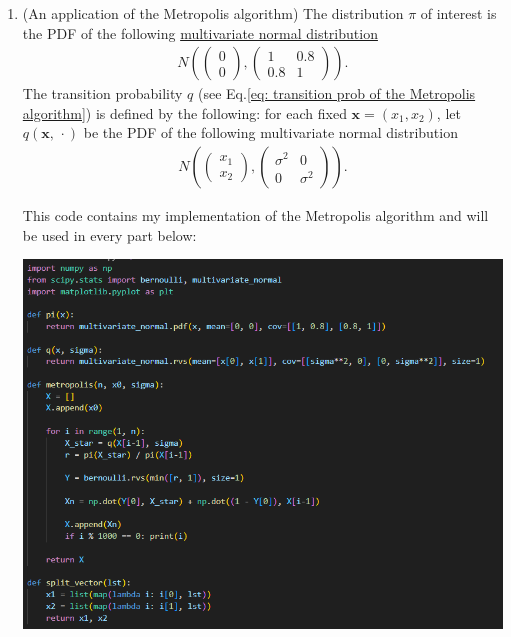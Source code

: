 \documentclass[11pt,letterpaper, leqno]{article}
\numberwithin{equation}{section}
\numberwithin{theorem}{section}
\numberwithin{lemma}{section}
\numberwithin{corollary}{section}
\numberwithin{definition}{section}
\numberwithin{proposition}{section}
\numberwithin{remark}{section}
\numberwithin{example}{section}
\begin{document}
\begin{enumerate}
\pagebreak

\item (An application of the Metropolis algorithm) The distribution $\pi$ of interest is the PDF of the following \href{https://en.wikipedia.org/wiki/Multivariate_normal_distribution}{multivariate normal distribution}
\begin{align*}
    N\left(\begin{pmatrix}
        0 \\
        0
    \end{pmatrix}, \begin{pmatrix}
        1 & 0.8 \\
        0.8 & 1
    \end{pmatrix}\right).
\end{align*}
The transition probability $q$ (see Eq.\eqref{eq: transition prob of the Metropolis algorithm}) is defined by the following: for each fixed $\boldsymbol{x}=(x_1,x_2)$, let $q(\boldsymbol{x},\,\cdot)$ be the PDF of the following multivariate normal distribution
\begin{align*}
    N\left(\begin{pmatrix}
        x_1 \\
        x_2
    \end{pmatrix}, \begin{pmatrix}
        \sigma^2 & 0 \\
        0 & \sigma^2
    \end{pmatrix}\right).
\end{align*}

    \color{blue}
        This code contains my implementation of the Metropolis algorithm and will be used in every part below:

        \includegraphics{Images/2. Code.png}


\end{enumerate}
\end{document}
